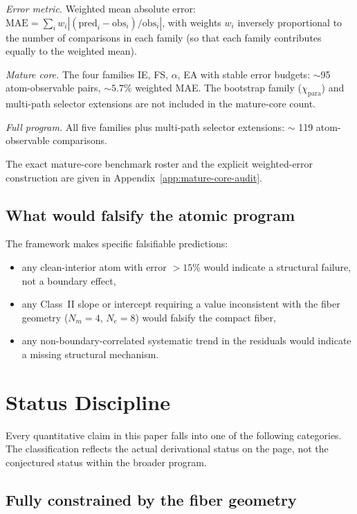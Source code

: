 \documentclass[11pt,a4paper]{article}
\begin{document}
\emph{Error metric.} Weighted mean absolute error: $\mathrm{MAE} = \sum_i w_i |(\mathrm{pred}_i - \mathrm{obs}_i)/\mathrm{obs}_i|$, with weights $w_i$ inversely proportional to the number of comparisons in each family (so that each family contributes equally to the weighted mean).

\emph{Mature core.} The four families IE, FS, $\alpha$, EA with stable error budgets: $\sim$95 atom-observable pairs, ${\sim}5.7\%$ weighted MAE. The bootstrap family ($\chi_{\mathrm{para}}$) and multi-path selector extensions are not included in the mature-core count.

\emph{Full program.} All five families plus multi-path selector extensions: $\sim$ 119 atom-observable comparisons.

The exact mature-core benchmark roster and the explicit weighted-error construction are given in Appendix~\ref{app:mature-core-audit}.

\subsection{What would falsify the atomic program}

The framework makes specific falsifiable predictions:
\begin{itemize}
\item any clean-interior atom with error $>15\%$ would indicate a structural failure, not a boundary effect,
\item any Class~II slope or intercept requiring a value inconsistent with the fiber geometry ($N_m = 4$, $N_e = 8$) would falsify the compact fiber,
\item any non-boundary-correlated systematic trend in the residuals would indicate a missing structural mechanism.
\end{itemize}

\section{Status Discipline}
\label{sec:status}

Every quantitative claim in this paper falls into one of the following categories. The classification reflects the actual derivational status on the page, not the conjectured status within the broader program.

\subsection{Fully constrained by the fiber geometry}
\end{document}
